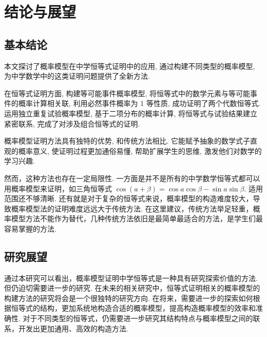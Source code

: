 
\chapter{结论与展望}
\section{基本结论}
本文探讨了概率模型在中学恒等式证明中的应用, 通过构建不同类型的概率模型, 为中学数学中的这类证明问题提供了全新方法. 

在恒等式证明方面, 构建等可能事件概率模型, 将恒等式中的数学元素与等可能事件的概率计算相关联, 利用必然事件概率为 1 等性质, 成功证明了两个代数恒等式. 运用独立重复试验概率模型, 基于二项分布的概率计算, 将恒等式与试验结果建立紧密联系, 完成了对涉及组合恒等式的证明. 

概率模型证明方法具有独特的优势, 和传统方法相比. 它能赋予抽象的数学式子直观的概率意义, 使证明过程更加通俗易懂, 帮助扩展学生的思维, 激发他们对数学的学习兴趣. 

然而，这种方法也存在一定局限性. 一方面是并不是所有的中学数学恒等式都可以用概率模型来证明，如三角恒等式 \(\cos ( {a + \beta })  = \cos a\cos \beta  - \sin a\sin \beta\). 适用范围还不够清晰. 还有就是对于复杂的恒等式来说，概率模型的构造难度较大，导致概率模型法的证明难度远远大于传统方法. 在这里建议，传统方法举足轻重，概率模型方法不能作为替代，几种传统方法依旧是最简单最适合的方法，是学生们最容易掌握的方法. ​



\section{研究展望}
通过本研究可以看出，概率模型证明中学恒等式是一种具有研究探索价值的方法. 但仍迫切需要进一步的研究. 在未来的相关研究中，恒等式证明相关的概率模型的构建方法的研究将会是一个很独特的研究方向. 在将来，需要进一步的探索如何根据恒等式的结构，更加系统地构造合适的概率模型，提高构造概率模型的效率和准确性. 对于不同类型的恒等式，仍需要进一步研究其结构特点与概率模型之间的联系，开发出更加通用、高效的构造方法. 


